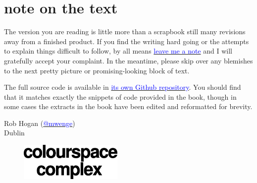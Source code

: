 \section*{note on the text}
The version you are reading is little more than a scrapbook still many revisions away from a
finished product. If you find the writing hard going or the attempts to explain things difficult
to follow, by all means \href{https://github.com/mwenge/psypixels/issues}{\textcolor{blue}{leave me a note}} and
I will gratefully accept your complaint. In the meantime, please skip over any blemishes
to the next pretty picture or promising-looking block of text.

The full source code is available in \href{https://github.com/mwenge/psychedelia}{\textcolor{blue}{its own Github repository}}. 
You should find that it matches exactly the snippets of code provided in the book, though in some cases the extracts in the book have been edited
and reformatted for brevity.


Rob Hogan (\href{https://mastodon.social/@mwenge}{\textcolor{blue}{@mwenge}})\\
Dublin \the\year{} \\

\clearpage
\clearpage
\shipout\null
\vspace*{\fill}
\begin{figure}[H]
    \centering
      \includegraphics[width=5cm]{src/cover/title_page_colorspace.png}%
\end{figure}
\vspace*{\fill}
\thispagestyle{empty}%
\clearpage
\shipout\null


